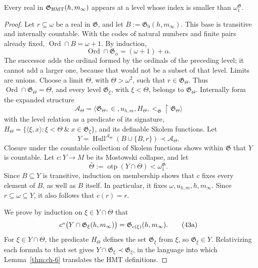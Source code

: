 \begin{lemma}
\label{thm:ch-8}
Every real in \(\mathfrak G_{\rm HMT}(h,m_\infty)\) appears at a level whose
index is smaller than \(\omega_1^{\mathfrak G}\).

\end{lemma}
\begin{proof}
Let \(r\subseteq\omega\) be a real in \(\mathfrak G\), and let
\(B:=\mathfrak G_0(h,m_\infty)\). This base is transitive and internally
countable. With the codes of natural numbers and finite pairs already fixed,
\(\operatorname{Ord}\cap B=\omega+1\). By induction,
\[
 \operatorname{Ord}\cap\mathfrak G_\alpha=(\omega+1)+\alpha.
\]
The successor adds the ordinal formed by the ordinals of the preceding level;
it cannot add a larger one, because that would not be a subset of that level.
Limits are unions. Choose a limit \(\Theta\), with \(\Theta>\omega^2\), such
that \(r\in\mathfrak G_\Theta\). Thus
\(\operatorname{Ord}\cap\mathfrak G_\Theta=\Theta\), and every level
\(\mathfrak G_\xi\), with \(\xi<\Theta\), belongs to
\(\mathfrak G_\Theta\). Internally form the expanded structure
\[
 \mathcal A_\Theta=
 \langle\mathfrak G_\Theta,\in,u_{h,m},
         H_\Theta,<_{\mathfrak G}\!\upharpoonright\mathfrak G_\Theta\rangle
\]
with the level relation as a predicate of its signature,
\(H_\Theta=\{\langle\xi,x\rangle:\xi<\Theta\ \&\
x\in\mathfrak G_\xi\}\), and its definable Skolem functions. Let
\[
 Y=\operatorname{Hull}^{\mathcal A_\Theta}
   (B\cup\{B,r\})\prec\mathcal A_\Theta .
\]
Closure under the countable collection of Skolem functions shows within
\(\mathfrak G\) that \(Y\) is countable. Let \(c:Y\rightarrow M\) be its
Mostowski collapse, and let
\[
 \bar\Theta:=\operatorname{otp}(Y\cap\Theta)
 <\omega_1^{\mathfrak G}.
\]
Since \(B\subseteq Y\) is transitive, induction on membership shows that
\(c\) fixes every element of \(B\), as well as \(B\) itself. In particular,
it fixes \(\omega,u_{h,m},h,m_\infty\). Since
\(r\subseteq\omega\subseteq Y\), it also follows that \(c(r)=r\).

We prove by induction on \(\xi\in Y\cap\Theta\) that
\[
 c``\bigl(Y\cap\mathfrak G_\xi(h,m_\infty)\bigr)
 =\mathfrak G_{c(\xi)}(h,m_\infty).
\tag{43a}\label{eq:ch-condensacion}
\]
For \(\xi\in Y\cap\Theta\), the predicate \(H_\Theta\) defines the set
\(\mathfrak G_\xi\) from \(\xi\), so \(\mathfrak G_\xi\in Y\).
Relativizing each formula to that set gives
\(Y\cap\mathfrak G_\xi\prec\mathfrak G_\xi\), in the language into which
Lemma~\ref{thm:ch-6} translates the HMT definitions.


\end{proof}
